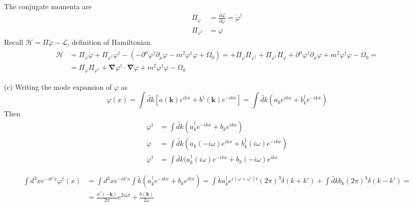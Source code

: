 \documentclass[twoside]{amsart}
\begin{document}
\begin{itemize}
The conjugate momenta are
\[
\begin{aligned}
  \Pi_{\varphi} & = \frac{ \partial \mathcal{L} }{\partial \dot{\varphi }} =  \dot{\varphi}^{\dag} \\  
  \Pi_{\varphi^{\dag}} & =  \dot{\varphi}
\end{aligned}
\]
Recall $\mathcal{H} = \Pi \dot{\varphi} - \mathcal{L}$, definition of Hamiltonian.  
\[
\begin{aligned}
  \mathcal{H} & = \Pi_{\varphi} \dot{\varphi} + \Pi_{\varphi^{\dag}} \dot{\varphi^{\dag}} - \left( - \partial^{\mu} \varphi^{\dag} \partial_{\mu} \varphi - m^2 \varphi^{\dag} \varphi + \Omega_0 \right) = + \Pi_{\varphi} \Pi_{\varphi^{\dag}} + \Pi_{\varphi^{\dag}} \Pi_{\varphi} + \partial^{\mu} \varphi^{\dag} \partial_{\mu} \varphi + m^2 \varphi^{\dag} \varphi - \Omega_0 = \\ 
  & = \boxed{  \Pi_{\varphi} \Pi_{\varphi^{\dag}} + \mathbf{\nabla} \varphi^{\dag} \cdot \mathbf{\nabla} \varphi + m^2 \varphi^{\dag} \varphi - \Omega_0 }
\end{aligned}
\]
\item[(c)]Writing the mode expansion of $\varphi$ as 
\[
\varphi(x) = \int \widetilde{dk} [ a(\mathbf{k}) e^{ikx} + b^{\dag}(\mathbf{k}) e^{-ikx} ] = \int \widetilde{dk} (a_k e^{ikx} + b^{\dag}_k e^{-ikx} )
\]
Then 
\[
\begin{aligned}
  \varphi^{\dag} & = \int \tilde{dk} (a_k^{\dag} e^{-ikx} + b_k e^{ikx} ) \\ 
  \dot{\varphi} & = \int \tilde{dk} ( a_k(-i\omega) e^{ikx} + b^{\dag}_k(i\omega) e^{-ikx} ) \\ 
  \dot{\varphi}^{\dag} & = \int \tilde{dk} (a_k^{\dag} (i\omega) e^{-ikx} + b_k (-i\omega) e^{ikx} 
\end{aligned}
\]

\[
\begin{aligned}
  \int d^3x e^{-ik'x} \varphi^{\dag}(x) & = \int d^3x e^{-ik'x} \int \tilde{k} (a_k^{\dag}e^{-ikx} + b_k e^{ikx} ) = \int \tilde{k} a_k^{\dag} e^{i(\omega + \omega') t} (2\pi)^3 \delta(k+k') + \int \tilde{dk} b_k(2\pi)^3 \delta(k-k')  = \\ 
  & = \frac{ a^{\dag}(-\mathbf{k}) }{2\pi } e^{2i\omega t} + \frac{b(\mathbf{k}) }{2\omega} 
\end{aligned}
\]


\end{itemize}
\end{document}
